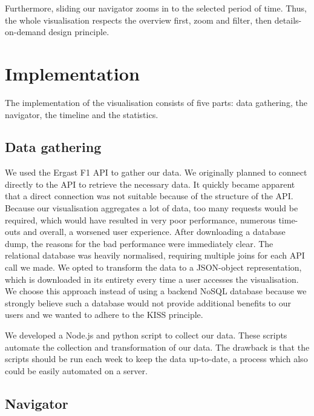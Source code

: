 \documentclass{sigchi}
\begin{document}
Furthermore, sliding our navigator zooms in to the selected period of time. Thus, the whole visualisation respects the overview first, zoom and filter, then details-on-demand design principle.
\section{Implementation} %
\label{sec:implementation}

The implementation of the visualisation consists of five parts: data gathering, the navigator, the timeline and the statistics.

\subsection{Data gathering} %

We used the Ergast F1 API to gather our data. We originally planned to connect directly to the API to retrieve the necessary data. It quickly became apparent that a direct connection was not suitable because of the structure of the API. Because our visualisation aggregates a lot of data, too many requests would be required, which would have resulted in very poor performance, numerous time-outs and overall, a worsened user experience. After downloading a database dump, the reasons for the bad performance were immediately clear. The relational database was heavily normalised, requiring multiple joins for each API call we made. We opted to transform the data to a JSON-object representation, which is downloaded in its entirety every time a user accesses the visualisation. We choose this approach instead of using a backend NoSQL database because we strongly believe such a database would not provide additional benefits to our users and we wanted to adhere to the KISS principle.

We developed a Node.js and python script to collect our data. These scripts automate the collection and transformation of our data. The drawback is that the scripts should be run each week to keep the data up-to-date, a process which also could be easily automated on a server.
\label{sub:data_gathering}

\subsection{Navigator} %
\label{sub:navigator}
\end{document}
